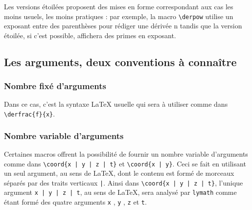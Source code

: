 \documentclass[12pt,a4paper]{article}
\begin{document}
Les versions étoilées proposent des mises en forme correspondant aux cas les moins usuels, les moins pratiques : par exemple, la macro \verb+\derpow+ utilise un exposant entre des parenthèses pour rédiger une dérivée n\ieme{} tandis que la version étoilée, si c'est possible, affichera des primes en exposant.




\subsection{Les arguments, deux conventions à connaître}

\subsubsection{Nombre fixé d'arguments}

Dans ce cas, c'est la syntaxe \LaTeX{} usuelle qui sera à utiliser comme dans \verb+\derfrac{f}{x}+.




\subsubsection{Nombre variable d'arguments}

Certaines macros offrent la possibilité de fournir un nombre variable d'arguments comme dans \verb+\coord{x | y | z | t}+ et \verb+\coord{x | y}+.
Ceci se fait en utilisant un seul argument, au sens de \LaTeX{}, dont le contenu est formé de morceaux séparés par des traits verticaux \verb+|+.
Ainsi dans \verb+\coord{x | y | z | t}+, l'unique argument \verb+x | y | z | t+, au sens de \LaTeX{}, sera analysé par \verb+lymath+ comme étant formé des quatre arguments \verb+x+ , \verb+y+ , \verb+z+ et \verb+t+.
\end{document}
